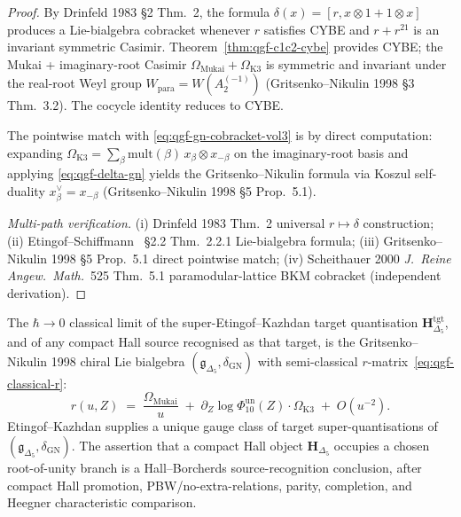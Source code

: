 \begin{proof}
By Drinfeld 1983 \S2 Thm.~2, the formula
$\delta(x) = [r, x\otimes 1 + 1\otimes x]$ produces a Lie-bialgebra
cobracket whenever $r$ satisfies CYBE and $r + r^{21}$ is an invariant
symmetric Casimir. Theorem~\ref{thm:qgf-c1c2-cybe} provides
CYBE; the Mukai + imaginary-root Casimir
$\Omega_{\mathrm{Mukai}} + \Omega_{\mathrm{K3}}$ is symmetric and
invariant under the real-root Weyl group
$W_{\mathrm{para}} = W(A_2^{(-1)})$ (Gritsenko--Nikulin 1998 \S3
Thm.~3.2). The cocycle identity reduces to CYBE.

The pointwise match with \eqref{eq:qgf-gn-cobracket-vol3} is by
direct computation: expanding
$\Omega_{\mathrm{K3}} = \sum_\beta\mathrm{mult}(\beta)\,x_\beta\otimes
x_{-\beta}$ on the imaginary-root basis and applying
\eqref{eq:qgf-delta-gn} yields the Gritsenko--Nikulin formula
via Koszul self-duality $x_\beta^\vee = x_{-\beta}$
(Gritsenko--Nikulin 1998 \S5 Prop.~5.1).

\emph{Multi-path verification.}
(i) Drinfeld 1983 Thm.~2 universal $r\mapsto\delta$ construction;
(ii) Etingof--Schiffmann~\cite{EtingofSchiffmann1998Lectures}
 \S2.2 Thm.~2.2.1 Lie-bialgebra formula;
(iii) Gritsenko--Nikulin 1998 \S5 Prop.~5.1 direct pointwise match;
(iv) Scheithauer 2000 \emph{J.\ Reine Angew.\ Math.}~525 Thm.~5.1
 paramodular-lattice BKM cobracket (independent derivation).
\end{proof}

\begin{theorem}
\label{thm:qgf-kazhdan-classical-limit}
The $\hbar\to 0$ classical limit of the super-Etingof--Kazhdan target
quantisation $\mathbf H_{\Delta_5}^{\mathrm{tgt}}$, and of any compact
Hall source recognised as that target, is the Gritsenko--Nikulin 1998
chiral Lie bialgebra $(\mathfrak g_{\Delta_5}, \delta_{\mathrm{GN}})$
with semi-classical $r$-matrix~\eqref{eq:qgf-classical-r}:
\begin{equation}
 r(u, Z)
 \;=\;
 \frac{\Omega_{\mathrm{Mukai}}}{u}
 \;+\;
 \partial_Z\log\Phi_{10}^{\mathrm{un}}(Z)\cdot\Omega_{\mathrm{K3}}
 \;+\;
 O(u^{-2}).
\end{equation}
Etingof--Kazhdan supplies a unique gauge class of target
super-quantisations of
$(\mathfrak g_{\Delta_5}, \delta_{\mathrm{GN}})$. The assertion that a
compact Hall object \(\mathbf H_{\Delta_5}\) occupies a chosen
root-of-unity branch is a Hall--Borcherds source-recognition conclusion,
after compact Hall promotion, PBW/no-extra-relations, parity,
completion, and Heegner characteristic comparison.
\end{theorem}

